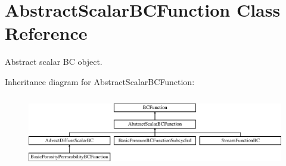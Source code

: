 \hypertarget{class_abstract_scalar_b_c_function}{\section{Abstract\-Scalar\-B\-C\-Function Class Reference}
\label{class_abstract_scalar_b_c_function}
}


Abstract scalar B\-C object.  


Inheritance diagram for Abstract\-Scalar\-B\-C\-Function\-:\begin{figure}[H]
\begin{center}
\leavevmode
\includegraphics[height=3.218391cm]{class_abstract_scalar_b_c_function}
\end{center}
\end{figure}
